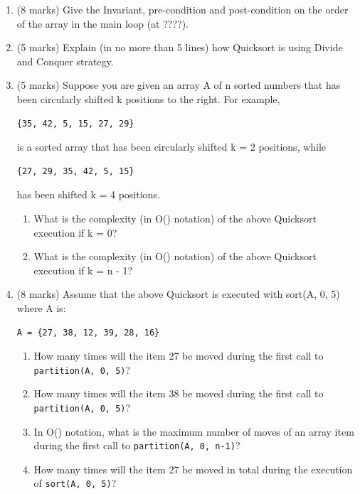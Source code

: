 \documentclass[twoside=false,DIV=14]{scrartcl}
\begin{document}
\begin{enumerate}
\item (8 marks) Give the Invariant, pre-condition and post-condition on the order of the array in the main loop (at ????).
\item (5 marks) Explain (in no more than 5 lines) how Quicksort is using Divide and Conquer strategy.

\item (5 marks) Suppose you are given an array A of n sorted numbers that has been circularly shifted k positions to the right. For example,
\begin{verbatim}
{35, 42, 5, 15, 27, 29}
\end{verbatim}
is a sorted array that has been circularly shifted k = 2 positions, while
\begin{verbatim}
{27, 29, 35, 42, 5, 15}
\end{verbatim}
has been shifted k = 4 positions.
\begin{enumerate}
\item What is the complexity (in O() notation) of the above Quicksort execution if k = 0?
\item What is the complexity (in O() notation) of the above Quicksort execution if k = n - 1?
\end{enumerate}
\item (8 marks) Assume that the above Quicksort is executed with sort(A, 0, 5) where A is:
\begin{verbatim}
A = {27, 38, 12, 39, 28, 16}
\end{verbatim}
\begin{enumerate}
\item How many times will the item 27 be moved during the first call to \verb+partition(A, 0, 5)+?
\item How many times will the item 38 be moved during the first call to \verb+partition(A, 0, 5)+?
\item In O() notation, what is the maximum number of moves of an array item during the
first call to \verb+partition(A, 0, n-1)+?
\item How many times will the item 27 be moved in total during the execution of \verb+sort(A, 0, 5)+?
\end{enumerate}
\end{enumerate}
 
\end{document}
